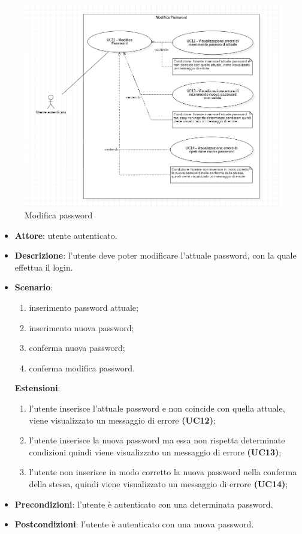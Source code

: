 \begin{figure}[H]
    \includegraphics[width=15cm]{sezioni/Images/UC11.png}
    \centering
    \caption{Modifica password}
\end{figure}

\begin{itemize}
    \item \textbf{Attore}: utente autenticato.
    \item \textbf{Descrizione}: l'utente deve poter modificare l'attuale password, con la quale effettua il login.
    \item \textbf{Scenario}:
    \begin{enumerate}
        \item inserimento password attuale;
        \item inserimento nuova password;
        \item conferma nuova password;
        \item conferma modifica password.
    \end{enumerate}
    \textbf{Estensioni}:
    \begin{enumerate}
        \item l'utente inserisce l'attuale password e non coincide con quella attuale, viene visualizzato un messaggio di errore \textbf{(UC12)};
        \item l'utente inserisce la nuova password ma essa non rispetta determinate condizioni quindi viene visualizzato un messaggio di errore \textbf{(UC13)};
        \item l'utente non inserisce in modo corretto la nuova password nella conferma della stessa, quindi viene visualizzato un messaggio di errore \textbf{(UC14)};
    \end{enumerate}

    \item \textbf{Precondizioni}: l'utente è autenticato con una determinata password.
    \item \textbf{Postcondizioni}: l'utente è autenticato con una nuova password.
\end{itemize}

